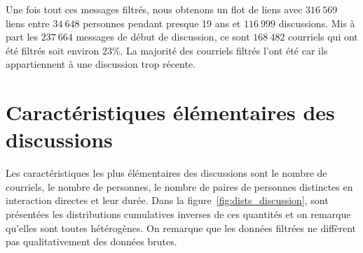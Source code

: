 Une fois tout ces messages filtrés, nous obtenons un flot de liens avec $316\ 569$ liens entre $34\ 648$ personnes pendant presque 19 ans et $116\ 999$ discussions.
Mis à part les $237\ 664$ messages de début de discussion, ce sont $168\ 482$ courriels qui ont été filtrés soit environ $23\%$.
La majorité des courriels filtrés l'ont été car ils appartiennent à une discussion trop récente.

\section{Caractéristiques élémentaires des discussions}

Les caractéristiques les plus élémentaires des discussions sont le nombre de courriels, le nombre de personnes, le nombre de paires de personnes distinctes en interaction directes et leur durée.
Dans la figure~\ref{fig:dists_discussion}, sont présentées les distributions cumulatives inverses de ces quantités et on remarque qu'elles sont toutes hétérogènes.
On remarque que les données filtrées ne diffèrent pas qualitativement des données brutes.

